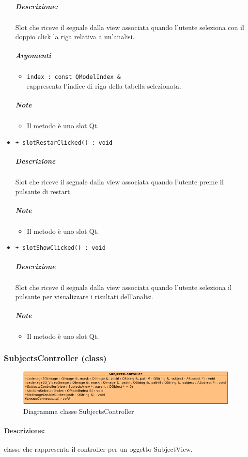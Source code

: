 \begin{itemize}
			\color{black}
			\subparagraph{Descrizione:} Slot\g{} che riceve il segnale dalla view associata quando l'utente seleziona con il doppio click la riga relativa a un'analisi.
			\color{black}
			\subparagraph{Argomenti}
			\begin{itemize}
				\item \color{RoyalPurple} \verb!index : const QModelIndex &!\\				
\color{black} rappresenta l'indice di riga della tabella selezionata.
			\end{itemize}
			\subparagraph{Note}
			\begin{itemize}
				\item Il metodo è uno slot\g{} Qt\g{}.
			\end{itemize}
			\item \color{blue} \verb!+ slotRestarClicked() : void!
			\color{black}
			\subparagraph{Descrizione} Slot\g{} che riceve il segnale dalla view associata quando l'utente preme il pulsante di restart.
			\subparagraph{Note}
			\begin{itemize}
				\item Il metodo è uno slot\g{} Qt\g{}.
			\end{itemize}
			\item \color{blue} \verb!+ slotShowClicked() : void!
			\color{black}
			\subparagraph{Descrizione} Slot\g{} che riceve il segnale dalla view associata quando l'utente seleziona il pulsante per visualizzare i risultati dell'analisi.
			\subparagraph{Note}
			\begin{itemize}
				\item Il metodo è uno slot\g{} Qt\g{}.
			\end{itemize}
		\end{itemize}
	\subsubsection{SubjectsController (class)}
	\begin{figure}[!h]
		\centering
		\includegraphics[scale=2.75]{./Content/Immagini/controller/SubjectsController.png}
		\caption{Diagramma classe SubjectsController}
	\end{figure}
	\paragraph{Descrizione:} classe che rappresenta il controller per un oggetto SubjectView.
